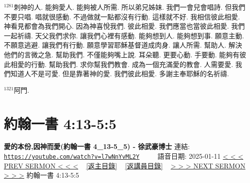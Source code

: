 \documentclass{book}
\begin{document}
$^{1281}$刺神的人.
能夠愛人.
能夠被人所需.
所以弟兄姊妹.
我們一會兒會唱詩.
但我們不要只唱.
唱就很感動.
不過做就一點都沒有行動.
這樣就不好.
我相信彼此相愛.
神看見都會為我們開心.
因為神喜悅我們.
彼此相愛.
我們應當也當彼此相愛.
我們一起祈禱.
天父我們求你.
讓我們心裡有感動.
能夠想到人.
能夠想到事.
願意主動.
不願意逃避.
讓我們有行動.
願意學習耶穌基督道成肉身.
讓人所需.
幫助人.
解決他們的言微之急.
幫助我們.
不僅能夠嘴上說.
耳朵聽.
更要心動.
手要動.
能夠有彼此相愛的行動.
幫助我們.
求你幫我們教會.
成為一個充滿愛的教會.
人需要愛.
我們知道人不是可愛.
但是靠著神的愛.
我們彼此相愛.
多謝主奉耶穌的名祈禱.

$^{1321}$阿門.
\newpage



\section{約翰一書 4:13-5:5}
\label{sec:l7wNnYvML2Y}
\textbf{愛的本份,因神而愛(約翰一書 4\_13-5\_5) - 徐武豪博士}
\newline
\newline
連結: \href{https://youtube.com/watch?v=l7wNnYvML2Y}{\texttt{https://youtube.com/watch?v=l7wNnYvML2Y}} ~~~~ 語音日期: 2025-01-11
\newline
\newline
\hyperref[sec:qbcjpAyQDGE]{< < < PREV SERMON < < <}
~
\hyperlink{toc}{[返主目錄]}
~
\hyperref[ch:preacher4]{[返講員目錄]}
~
\hyperref[sec:cau3XNPSx68]{> > > NEXT SERMON > > >}
\newline
\newline
約翰一書 4:13-5:5
\newline
\end{document}
